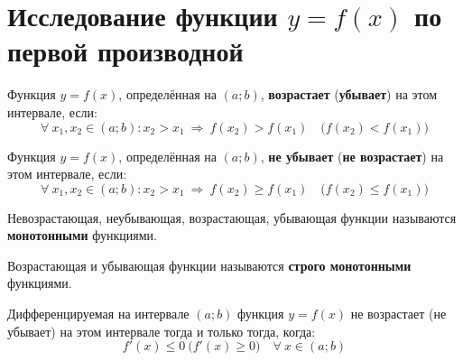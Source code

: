 \section{Исследование функции $y = f(x)$ по первой производной}
\begin{definition}
	Функция $y=f(x)$, определённая на $(a;b)$, \textbf{возрастает} (\textbf{убывает}) на этом интервале, если: \[ \forall\ x_1, x_2 \in (a;b)\colon x_2 > x_1\ \Rightarrow\ f(x_2) > f(x_1)\quad \Big(f(x_2) < f(x_1)\Big) \]
\end{definition}
\begin{definition}
	Функция $y=f(x)$, определённая на $(a;b)$, \textbf{не убывает} (\textbf{не возрастает}) на этом интервале, если:
	\[ \forall\ x_1, x_2 \in (a;b)\colon x_2 > x_1\ \Rightarrow\ f(x_2) \ge f(x_1)\quad \Big(f(x_2) \le f(x_1)\Big) \]
\end{definition}
\begin{definition}
	Невозрастающая, неубывающая, возрастающая, убывающая функции называются \textbf{монотонными} функциями.
\end{definition}
\begin{definition}
	Возрастающая и убывающая функции называются \textbf{строго монотонными} функциями.
\end{definition}
\begin{theorem}
	Дифференцируемая на интервале $(a;b)$ функция $y=f(x)$ не возрастает (не убывает) на этом интервале тогда и только тогда, когда:
	\[ f'(x) \le 0\ \Big(f'(x) \ge 0\Big)\quad \forall\ x \in (a;b) \]
\end{theorem}
